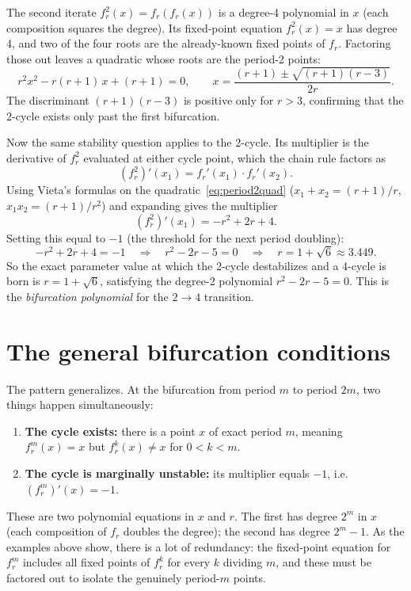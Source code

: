 \documentclass[11pt]{article}
\begin{document}
The second iterate $f_r^2(x)=f_r(f_r(x))$ is a degree-4 polynomial in $x$
(each composition squares the degree).  Its fixed-point equation $f_r^2(x)=x$
has degree 4, and two of the four roots are the already-known fixed points of
$f_r$.  Factoring those out leaves a quadratic whose roots are the period-2
points:
\begin{equation}
\label{eq:period2quad}
r^2 x^2 - r(r+1)\,x + (r+1) = 0, \qquad
x = \frac{(r+1)\pm\sqrt{(r+1)(r-3)}}{2r}.
\end{equation}
The discriminant $(r+1)(r-3)$ is positive only for $r>3$, confirming that the
2-cycle exists only past the first bifurcation.

Now the same stability question applies to the 2-cycle.  Its multiplier is the
derivative of $f_r^2$ evaluated at either cycle point, which the chain rule
factors as
\[
(f_r^2)'(x_1) = f_r'(x_1)\cdot f_r'(x_2).
\]
Using Vieta's formulas on the quadratic~\eqref{eq:period2quad} ($x_1+x_2 =
(r+1)/r$, $x_1 x_2 = (r+1)/r^2$) and expanding gives the multiplier
\begin{equation}
\label{eq:mult2}
(f_r^2)'(x_1) = -r^2+2r+4.
\end{equation}
Setting this equal to $-1$ (the threshold for the next period doubling):
\[
-r^2+2r+4 = -1 \quad\Longrightarrow\quad r^2-2r-5=0
\quad\Longrightarrow\quad r=1+\sqrt{6}\approx 3.449.
\]
So the exact parameter value at which the 2-cycle destabilizes and a 4-cycle is
born is $r=1+\sqrt{6}$, satisfying the degree-2 polynomial $r^2-2r-5=0$.  This
is the \emph{bifurcation polynomial} for the $2\to 4$ transition.

\section{The general bifurcation conditions}
\label{sec:general}

The pattern generalizes.  At the bifurcation from period $m$ to period $2m$,
two things happen simultaneously:
\begin{enumerate}
\item \textbf{The cycle exists:} there is a point $x$ of exact period $m$,
      meaning $f_r^m(x)=x$ but $f_r^k(x)\ne x$ for $0<k<m$.
\item \textbf{The cycle is marginally unstable:} its multiplier equals $-1$,
      i.e.\ $(f_r^m)'(x)=-1$.
\end{enumerate}
These are two polynomial equations in $x$ and $r$.  The first has degree $2^m$
in $x$ (each composition of $f_r$ doubles the degree); the second has degree
$2^m-1$.  As the examples above show, there is a lot of redundancy: the
fixed-point equation for $f_r^m$ includes all fixed points of $f_r^k$ for every
$k$ dividing $m$, and these must be factored out to isolate the genuinely
period-$m$ points.
\end{document}
